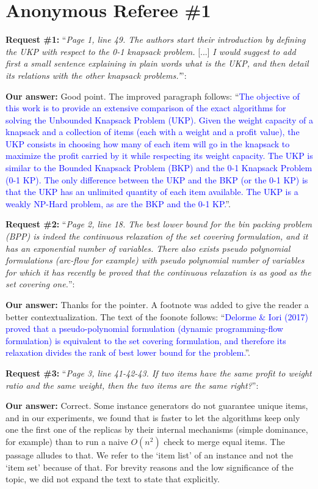 \documentclass{elsarticle}
\begin{document}
\section{Anonymous Referee \#1}

\textbf{Request \#1:} ``\textit{Page 1, line 49. The authors start their introduction by defining the UKP with respect to the 0-1 knapsack problem.} [...] \textit{I would suggest to add first a small sentence explaining in plain words what is the UKP, and then detail its relations with the other knapsack problems.'}'': 

\textbf{Our answer:} Good point. The improved paragraph follows: ``\textcolor{blue}{The objective of this work is to provide an extensive comparison of the exact algorithms for solving the Unbounded Knapsack Problem (UKP). Given the weight capacity of a knapsack and a collection of items (each with a weight and a profit value), the UKP consists in choosing how many of each item will go in the knapsack to maximize the profit carried by it while respecting its weight capacity. The UKP is similar to the Bounded Knapsack Problem (BKP) and the 0-1 Knapsack Problem (0-1 KP). The only difference between the UKP and the BKP (or the 0-1 KP) is that the UKP has an unlimited quantity of each item available. The UKP is a weakly NP-Hard problem, as are the BKP and the 0-1 KP.}''.
\medskip

\textbf{Request \#2:} ``\textit{Page 2, line 18. The best lower bound for the bin packing problem (BPP) is indeed the continuous relaxation of the set covering formulation, and it has an exponential number of variables. There also exists pseudo polynomial formulations (arc-flow for example) with pseudo polynomial number of variables for which it has recently be proved that the continuous relaxation is as good as the set covering one.}'': 

\textbf{Our answer:} Thanks for the pointer. A footnote was added to give the reader a better contextualization. The text of the foonote follows: ``\textcolor{blue}{Delorme \& Iori (2017) proved that a pseudo-polynomial formulation (dynamic programming-flow formulation) is equivalent to the set covering formulation, and therefore its relaxation divides the rank of best lower bound for the problem.}''.
\medskip

\textbf{Request \#3:} ``\textit{Page 3, line 41-42-43. If two items have the same profit to weight ratio and the same weight, then the two items are the same right?}'': 

\textbf{Our answer:} Correct. Some instance generators do not guarantee unique items, and in our experiments, we found that is faster to let the algorithms keep only one the first one of the replicas by their internal mechanisms (simple dominance, for example) than to run a naive \(O(n^2)\) check to merge equal items. The passage alludes to that. We refer to the `item list' of an instance and not the `item set' because of that. For brevity reasons and the low significance of the topic, we did not expand the text to state that explicitly.
\medskip
\end{document}
